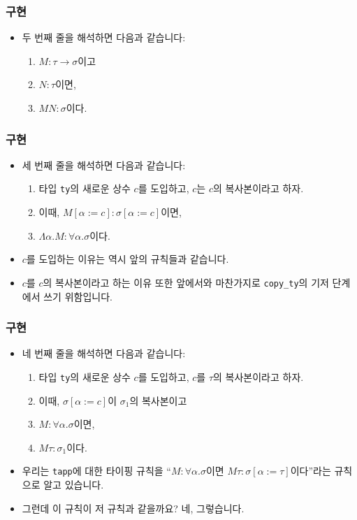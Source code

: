 \documentclass[slidestop,compress,mathserif]{beamer}
\begin{document}
    \begin{frame}
        \frametitle{구현}
        \begin{itemize}
            \item 두 번째 줄을 해석하면 다음과 같습니다:
            \begin{enumerate}
                \item $M : \tau \to \sigma$이고
                \item $N : \tau$이면,
                \item $M N : \sigma$이다.
            \end{enumerate}
        \end{itemize}
    \end{frame}

    \begin{frame}
        \frametitle{구현}
        \begin{itemize}
            \item 세 번째 줄을 해석하면 다음과 같습니다:
            \begin{enumerate}
                \item 타입 \texttt{ty}의 새로운 상수 $c$를 도입하고, $c$는 $c$의 복사본이라고 하자.
                \item 이때, $M \left[ \alpha := c \right] : \sigma \left[ \alpha := c \right]$이면,
                \item $\Lambda \alpha . M : \forall \alpha . \sigma$이다.
            \end{enumerate}
            \item $c$를 도입하는 이유는 역시 앞의 규칙들과 같습니다.
            \item $c$를 $c$의 복사본이라고 하는 이유 또한 앞에서와 마찬가지로 \texttt{copy\_ty}의 기저 단계에서 쓰기 위함입니다.
        \end{itemize}
    \end{frame}

    \begin{frame}
        \frametitle{구현}
        \begin{itemize}
            \item 네 번째 줄을 해석하면 다음과 같습니다:
            \begin{enumerate}
                \item 타입 \texttt{ty}의 새로운 상수 $c$를 도입하고, $c$를 $\tau$의 복사본이라고 하자.
                \item 이때, $\sigma \left[ \alpha := c \right]$이 $\sigma_1$의 복사본이고
                \item $M : \forall \alpha . \sigma$이면,
                \item $M \tau : \sigma_1$이다. 
            \end{enumerate}
            \item 우리는 \texttt{tapp}에 대한 타이핑 규칙을 ``$M : \forall \alpha . \sigma$이면 $M \tau : \sigma \left[ \alpha := \tau \right]$이다''라는 규칙으로 알고 있습니다.
            \item 그런데 이 규칙이 저 규칙과 같을까요? 네, 그렇습니다.
        \end{itemize}
    \end{frame}
\end{document}
